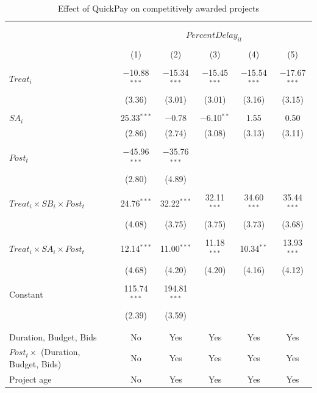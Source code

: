 \documentclass[
]{article}
\begin{document}
\begin{table}[H] \centering 
  \caption{Effect of QuickPay on competitively awarded projects} 
  \label{} 
\small 
\begin{tabular}{@{\extracolsep{-2pt}}lccccc} 
\\[-1.8ex]\hline 
\hline \\[-1.8ex] 
\\[-1.8ex] & \multicolumn{5}{c}{$PercentDelay_{it}$  } \\ 
\\[-1.8ex] & (1) & (2) & (3) & (4) & (5)\\ 
\hline \\[-1.8ex] 
 $Treat_i$ & $-$10.88$^{***}$ & $-$15.34$^{***}$ & $-$15.45$^{***}$ & $-$15.54$^{***}$ & $-$17.67$^{***}$ \\ 
  & (3.36) & (3.01) & (3.01) & (3.16) & (3.15) \\ 
  & & & & & \\ 
 $SA_i$ & 25.33$^{***}$ & $-$0.78 & $-$6.10$^{**}$ & 1.55 & 0.50 \\ 
  & (2.86) & (2.74) & (3.08) & (3.13) & (3.11) \\ 
  & & & & & \\ 
 $Post_t$ & $-$45.96$^{***}$ & $-$35.76$^{***}$ &  &  &  \\ 
  & (2.80) & (4.89) &  &  &  \\ 
  & & & & & \\ 
 $Treat_i \times SB_i \times Post_t$ & 24.76$^{***}$ & 32.22$^{***}$ & 32.11$^{***}$ & 34.60$^{***}$ & 35.44$^{***}$ \\ 
  & (4.08) & (3.75) & (3.75) & (3.73) & (3.68) \\ 
  & & & & & \\ 
 $Treat_i \times SA_i \times Post_t$ & 12.14$^{***}$ & 11.00$^{***}$ & 11.18$^{***}$ & 10.34$^{**}$ & 13.93$^{***}$ \\ 
  & (4.68) & (4.20) & (4.20) & (4.16) & (4.12) \\ 
  & & & & & \\ 
 Constant & 115.74$^{***}$ & 194.81$^{***}$ &  &  &  \\ 
  & (2.39) & (3.59) &  &  &  \\ 
  & & & & & \\ 
\hline \\[-1.8ex] 
Duration, Budget, Bids & No & Yes & Yes & Yes & Yes \\ 
$Post_t \times $  (Duration, Budget, Bids) & No & Yes & Yes & Yes & Yes \\ 
Project age & No & Yes & Yes & Yes & Yes \\ 

\end{tabular}
\end{table}
\end{document}
